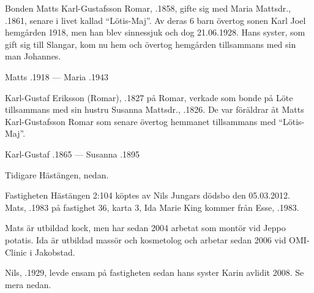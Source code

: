 %
Bonden Matts Karl-Gustafsson Romar, .1858, gifte sig med Maria Mattsdr., .1861, senare i livet kallad ``Lötis-Maj''. Av deras 6 barn övertog sonen Karl Joel hemgården 1918, men han blev sinnessjuk och dog 21.06.1928. Hans syster, som gift sig till Slangar, kom nu hem och övertog hemgården tillsammans med sin man Johannes.

Matts .1918  ---  Maria .1943


%
Karl-Gustaf Eriksson (Romar), .1827 på Romar, verkade som bonde på Löte tillsammans med sin hustru Susanna Mattsdr., .1826. De var föräldrar åt Matts Karl-Gustafsson Romar som senare övertog hemmanet tillsammans med ``Lötis-Maj''.

Karl-Gustaf .1865  ---  Susanna .1895



%
Tidigare Hästängen, nedan.



%
Fastigheten Hästängen 2:104 köptes av Nils Jungars dödsbo den 05.03.2012. Mats, .1983 på fastighet 36, karta 3, Ida Marie King kommer från Esse, .1983.

Mats är utbildad kock, men har sedan 2004 arbetat som montör vid Jeppo potatis. Ida är utbildad massör och kosmetolog och arbetar sedan 2006 vid OMI-Clinic i Jakobstad.
\begin{jhchildren}
  \item {}
  \item {}
  \item {}
\end{jhchildren}

%

%
Nils, .1929, levde ensam på fastigheten sedan hans syster Karin avlidit 2008. Se mera nedan.


